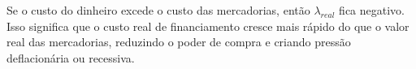 Se o custo do dinheiro excede o custo das mercadorias, então $\lambda_{real}$ fica negativo. Isso significa que o custo real de financiamento cresce mais rápido do que o valor real das mercadorias, reduzindo o poder de compra e criando pressão deflacionária ou recessiva. 